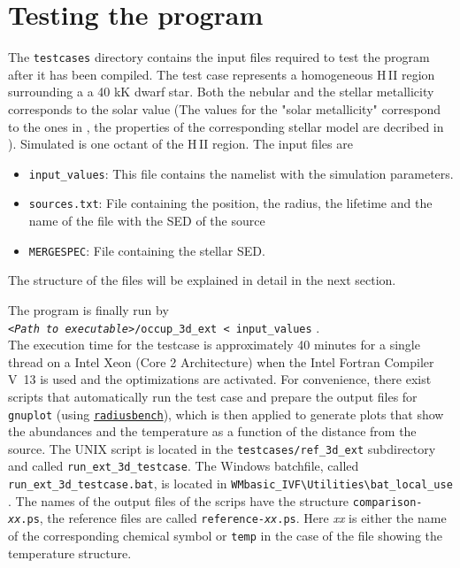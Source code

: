 \documentclass[a4paper,10pt]{article}
\begin{document}
\section{Testing the program}
The \texttt{testcases} directory contains the input files required to test the 
program after it has been compiled. The test case represents a homogeneous 
H\,II region surrounding a a 40 kK dwarf star. Both the nebular and the stellar 
metallicity corresponds to the solar value (The values for the "solar 
metallicity" correspond to the ones in \citealt{Asplund2009}, the properties of 
the corresponding stellar model are decribed in \citealt{Weber2015}). Simulated 
is one octant of the H\,II region. The input files are
\begin{itemize}
\item \texttt{input\_values}: This file contains the namelist with the  
simulation parameters.
\item \texttt{sources.txt}: File containing the position, the radius, the  
lifetime and the name of the file with the SED of the source
\item \texttt{MERGESPEC}: File containing the stellar SED.
\end{itemize}
The structure of the files will be explained in detail in the next section.

The program is finally run by\\
\texttt{\textit{<Path to executable>}/occup\_3d\_ext < input\_values} . \\
The execution time for the testcase is approximately 40 minutes for a single  
thread on a Intel Xeon (Core 2 Architecture) when the Intel Fortran Compiler 
V~13 is used and the optimizations are activated. 
For convenience, there exist scripts that automatically run the test case and  
prepare the output files for \texttt{gnuplot} 
(using \texttt{\hyperref[util:radiusbench]{radiusbench}}), 
which is then applied to generate plots that show the abundances  and the  
temperature as a function of the distance from the source.
The UNIX script is located in the \texttt{testcases/ref\_3d\_ext}  subdirectory 
and called \texttt{run\_ext\_3d\_testcase}. The Windows batchfile, called  
\texttt{run\_ext\_3d\_testcase.bat}, is located in 
\texttt{WMbasic\_IVF\textbackslash Utilities\textbackslash bat\_local\_use} .
The names of the output files of the scrips have the structure  
\texttt{comparison-\textit{xx}.ps}, the reference files are called 
\texttt{reference-\textit{xx}.ps}. Here \textit{xx} is either the
name of the corresponding chemical symbol or \texttt{temp} in the case of the	 
file showing the temperature structure.
\end{document}
